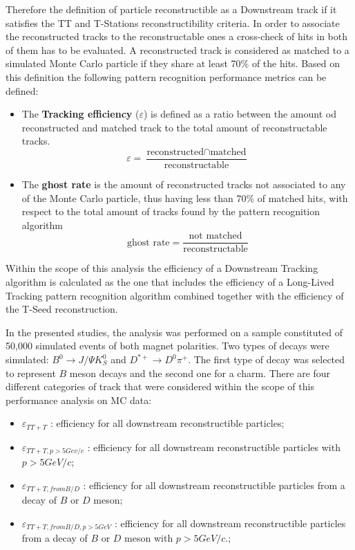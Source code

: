 Therefore the definition of particle reconstructible as a Downstream track if it satisfies the TT and T-Stations reconstructibility criteria. In order to associate the reconstructed tracks to the reconstructable ones a cross-check of hits in both of them has to be evaluated. A reconstructed track is considered as matched to a simulated Monte Carlo particle if they share at least 70\% of the hits.  
Based on this definition the following pattern recognition performance metrics can be defined: 

\begin{itemize}
    \item The \textbf{Tracking efficiency} ($\varepsilon$) is defined as a ratio between the amount od reconstructed and matched track to the total amount of reconstructable tracks. 
    \begin{equation}
        \varepsilon  = \frac{\textrm{reconstructed} \cap  \textrm{matched}}{\textrm{reconstructable}}
    \end{equation}
    \item The \textbf{ghost rate} is the amount of reconstructed tracks not associated to any of the Monte Carlo particle, thus having less than 70\% of matched hits, with respect to the total amount of tracks found by the pattern recognition algorithm
    \begin{equation}
       \textrm{ghost rate} =  \frac{\textrm{not matched}}{\textrm{reconstructable}}
    \end{equation}
\end{itemize}

 Within the scope of this analysis the efficiency of a Downstream Tracking algorithm is calculated as the one that includes the efficiency of a Long-Lived Tracking pattern recognition algorithm combined together with the efficiency of the T-Seed reconstruction.

In the presented studies, the analysis was performed on a sample constituted of 50,000 simulated events of both magnet polarities. Two types of decays were simulated: $B^{0} \rightarrow J/\Psi K^{0}_{S}$ and $D^{*+} \rightarrow D^{0}\pi^+$. The first type of decay was selected to represent $B$ meson decays and the second one for a charm. 
There are four different categories of track that were considered within the scope of this performance analysis on MC data:

\begin{itemize}
    \item $\varepsilon_{TT+T}$ : efficiency for all downstream reconstructible particles;
    \item $\varepsilon_{TT+T, p>5Gev/c}$ : efficiency for all downstream reconstructible particles with $p> 5 GeV/c$;
    \item $\varepsilon_{TT+T, from B/D}$ : efficiency for all downstream reconstructible particles from a decay of $B$ or $D$ meson;
    \item $\varepsilon_{TT+T, from B/D, p>5 GeV }$ : efficiency for all downstream reconstructible particles from a decay of $B$ or $D$ meson with  $p> 5 GeV/c$.;
\end{itemize}

